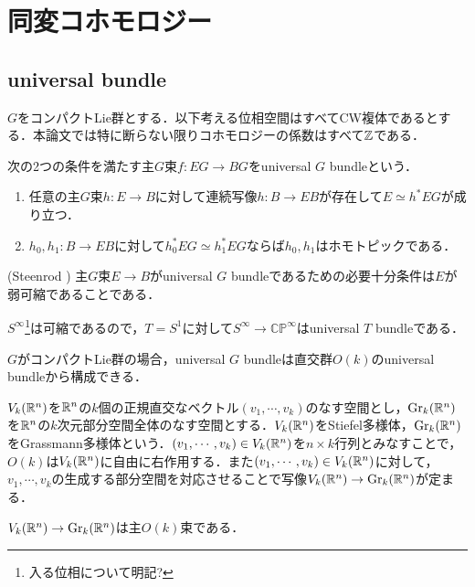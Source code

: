 \section{同変コホモロジー}
\subsection{universal bundle}

$G$をコンパクトLie群とする．以下考える位相空間はすべてCW複体であるとする．本論文では特に断らない限りコホモロジーの係数はすべて$\mathbb{Z}$である．

\begin{defin}
  次の2つの条件を満たす主$G$束$f\colon EG\rightarrow BG$をuniversal $G$ bundleという．
  \begin{enumerate}
    \item 任意の主$G$束$h\colon E\rightarrow B$に対して連続写像$h\colon B\rightarrow EB$が存在して$E\simeq h^*EG$が成り立つ．
    \item $h_0,h_1\colon B\rightarrow EB$に対して$h_0^*EG\simeq h_1^*EG$ならば$h_0,h_1$はホモトピックである．
  \end{enumerate}
\end{defin}

\begin{theo}(Steenrod \cite{steenrod})\label{steenrod}
  主$G$束$E\rightarrow B$がuniversal $G$ bundleであるための必要十分条件は$E$が弱可縮であることである．
\end{theo}

\begin{eg}
  $S^\infty$\footnote{入る位相について明記?}は可縮であるので，$T=S^1$に対して$S^\infty\rightarrow \mathbb{CP}^\infty$はuniversal $T$ bundleである．
\end{eg}

$G$がコンパクトLie群の場合，universal $G$ bundleは直交群$O(k)$のuniversal bundleから構成できる．

$V_k(\mathbb{R}^n)$を$\mathbb{R}^n$の$k$個の正規直交なベクトル$(v_1,\cdots,v_k)$のなす空間とし，$\text{Gr}_k(\mathbb{R}^n)$を$\mathbb{R}^n$の$k$次元部分空間全体のなす空間とする．$V_k(\mathbb{R}^n)$をStiefel多様体，$\text{Gr}_k(\mathbb{R}^n)$をGrassmann多様体という．$(v_1,\cdots,v_k)\in V_k(\mathbb{R}^n)$を$n\times k$行列とみなすことで，$O(k)$は$V_k(\mathbb{R}^n)$に自由に右作用する．また$(v_1,\cdots,v_k)\in V_k(\mathbb{R}^n)$に対して，$v_1,\cdots,v_k$の生成する部分空間を対応させることで写像$V_k(\mathbb{R}^n)\rightarrow \text{Gr}_k(\mathbb{R}^n)$が定まる．

\begin{prop}
  $V_k(\mathbb{R}^n)\rightarrow \text{Gr}_k(\mathbb{R}^n)$は主$O(k)$束である．
\end{prop}

